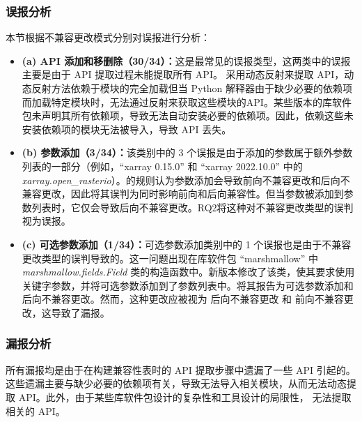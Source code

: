 
\subsubsection{误报分析}
本节根据不兼容更改模式分别对误报进行分析：
\begin{itemize}
	\item \textbf{(a) API 添加和移删除（30/34）：}这是最常见的误报类型，这两类中的误报主要是由于 API 提取过程未能提取所有 API。\tool{} 采用动态反射来提取 API，动态反射方法依赖于模块的完全加载但当 Python 解释器由于缺少必要的依赖项而加载特定模块时，\tool{}无法通过反射来获取这些模块的API。某些版本的库软件包未声明其所有依赖项，导致无法自动安装必要的依赖项。因此，依赖这些未安装依赖项的模块无法被导入，导致 API 丢失。
	\item \textbf{ (b) 参数添加（3/34）：}该类别中的 3 个误报是由于添加的参数属于额外参数列表的一部分（例如，“xarray 0.15.0” 和 “xarray 2022.10.0”  中的 \textit{xarray.open\_rasterio}）。\tool{}的规则认为参数添加会导致前向不兼容更改和后向不兼容更改，因此\tool{}将其误判为同时影响前向和后向兼容性。但当参数被添加到参数列表时，它仅会导致后向不兼容更改。RQ2将这种对不兼容更改类型的误判视为误报。
	\item \textbf{ (c) 可选参数添加（1/34）：}可选参数添加类别中的 1 个误报也是由于不兼容更改类型的误判导致的。这一问题出现在库软件包 “marshmallow”  中\textit{ marshmallow.fields.Field} 类的构造函数中。新版本修改了该类，使其要求使用关键字参数，并将可选参数添加到了参数列表中。\tool{}将其报告为可选参数添加和后向不兼容更改。然而，这种更改应被视为 后向不兼容更改 和 前向不兼容更改，这导致了漏报。
\end{itemize}

\subsubsection{漏报分析}
所有漏报均是由于在构建兼容性表时的 API 提取步骤中遗漏了一些 API 引起的。这些遗漏主要与缺少必要的依赖项有关，导致无法导入相关模块，从而无法动态提取 API。此外，由于某些库软件包设计的复杂性和工具设计的局限性，\tool{} 无法提取相关的 API。

